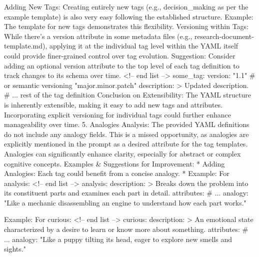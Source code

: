 {Adding New Tags: Creating entirely new tags (e.g., decision_making as per the example template) is also very easy following the established structure.
Example: The template for new tags demonstrates this flexibility.
Versioning within Tags: While there's a version attribute in some metadata files (e.g., research-document-template.md), applying it at the individual tag level within the YAML itself could provide finer-grained control over tag evolution.
Suggestion: Consider adding an optional version attribute to the top level of each tag definition to track changes to its schema over time. <!-- end list --> some_tag: version: "1.1" # or semantic versioning "major.minor.patch" description: > Updated description. # ... rest of the tag definition
Conclusion on Extensibility: The YAML structure is inherently extensible, making it easy to add new tags and attributes. Incorporating explicit versioning for individual tags could further enhance manageability over time.
5. Analogies
Analysis: The provided YAML definitions do not include any analogy fields. This is a missed opportunity, as analogies are explicitly mentioned in the prompt as a desired attribute for the tag templates. Analogies can significantly enhance clarity, especially for abstract or complex cognitive concepts.
Examples & Suggestions for Improvement:
 * Adding Analogies: Each tag could benefit from a concise analogy.
   * Example: For analysis:
     <!-- end list -->
   analysis:
  description: >
    Breaks down the problem into its constituent parts and examines each part in detail.
  attributes:
    # ...
  analogy: "Like a mechanic disassembling an engine to understand how each part works."

Example: For curious:
<!-- end list -->
curious:
description: >
An emotional state characterized by a desire to learn or know more about something.
attributes:
# ...
analogy: "Like a puppy tilting its head, eager to explore new smells and sights."

}
